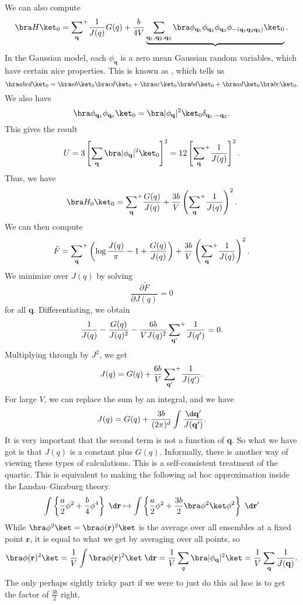 \documentclass[a4paper]{article}
\newcommand\splus{\!{\vphantom{\prod}}^+}
\begin{document}
We can also compute
\[
  \bra H\ket_0 = \sum_\mathbf{q} \splus \frac{1}{J(q)} G(q) + \frac{b}{4V} \underbrace{\sum_{\mathbf{q}_1, \mathbf{q}_2, \mathbf{q}_3}\bra \phi_{\mathbf{q}_1} \phi_{\mathbf{q}_2} \phi_{\mathbf{q}_3} \phi_{-(\mathbf{q}_1 \mathbf{q}_2 \mathbf{q}_3)}\ket_0}.
\]
In the Gaussian model, each $\phi_\mathbf{q}$ is a zero mean Gaussian random variables, which have certain nice properties. This is known as , which tells us
\[
  \bra abcd \ket_0 = \bra ab\ket_0 \bra cd\ket_0 + \bra ac\ket_0 \bra bd\ket_0 + \bra ad\ket_0 \bra bc\ket_0.
\]
We also have
\[
\bra \phi_{\mathbf{q}_1} \phi_{\mathbf{q}_0}\ket_0 = \bra |\phi_\mathbf{q}|^2 \ket_0 \delta_{\mathbf{q}_1, - \mathbf{q}_2}.
\]
This gives the result
\[
  U = 3 \left[\sum_\mathbf{q} \bra |\phi_\mathbf{q}|^2\ket_0\right]^2 = 12 \left[\sum_\mathbf{q} \splus \frac{1}{J(q)}\right]^2.
\]
Thus, we have
\[
  \bra H_0\ket_0 = \sum_{\mathbf{q}} \splus \frac{G(q)}{J(q)} + \frac{3b}{V} \left(\sum_\mathbf{q} \splus \frac{1}{J(q)}\right)^2.
\]
We can then compute
\[
  \tilde{F} = \sum_{\mathbf{q}} \splus \left(\log \frac{J(q)}{\pi} - 1 + \frac{G(q)}{J(q)}\right) + \frac{3b}{V}\left(\sum_\mathbf{q} \splus \frac{1}{J(q)}\right)^2.
\]
We minimize over $J(q)$ by solving
\[
  \frac{\partial \tilde{F}}{\partial J(q)} = 0
\]
for all $\mathbf{q}$. Differentiating, we obtain
\[
  \frac{1}{J(q)} - \frac{G(q)}{J(q)^2} - \frac{6b}{V J(q)^2} \sum_{\mathbf{q}'} \splus \frac{1}{J(q')} = 0.
\]
Multiplying through by $J^2$, we get
\[
  J(q) = G(q) + \frac{6b}{V} \sum_{\mathbf{q}'} \splus \frac{1}{J(q')}.
\]
For large $V$, we can replace the sum by an integral, and we have
\[
  J(q) = G(q) + \frac{3b}{(2\pi)^d} \int \frac{\d \mathbf{q}'}{J(\mathbf{q}')}.
\]
It is very important that the second term is not a function of $\mathbf{q}$. So what we have got is that $J(q)$ is a constant plus $G(q)$. Informally, there is another way of viewing these types of calculations. This is a self-consistent treatment of the quartic. This is equivalent to making the following ad hoc approximation inside the Landau--Ginzburg theory.
\[
  \int \left\{ \frac{a}{2} \phi^2 + \frac{b}{4} \phi^4\right\} \;\d \mathbf{r} \mapsto \int \left\{ \frac{a}{2} \phi^2 + \frac{3b}{2} \bra \phi^2 \ket \phi^2\right\}\;\d \mathbf{r}'
\]
While $\bra \phi^2\ket = \bra \phi(\mathbf{r})^2\ket$ is the average over all ensembles at a fixed point $\mathbf{r}$, it is equal to what we get by averaging over all points, so
\[
  \bra \phi(\mathbf{r})^2\ket = \frac{1}{V} \int \bra \phi(\mathbf{r})^2\ket \;\d \mathbf{r} = \frac{1}{V} \sum_q \bra |\phi_\mathbf{q}|^2 \ket = \frac{1}{V} \sum_{\mathbf{q}} \frac{1}{J(\mathbf{q})}.
\]
The only perhaps sightly tricky part if we were to just do this ad hoc is to get the factor of $\frac{3b}{2}$ right.
\end{document}

